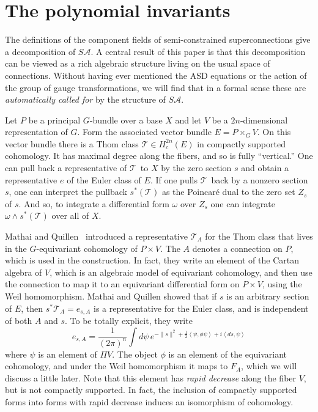 \documentclass[twoside]{amsart}
\newcommand{\enm}[1]{\ensuremath{#1}}
\renewcommand{\aa}{\enm{\mathcal{A}}}
\newcommand{\sa}{\enm{S\aa}}
\newcommand{\ip}[2]{\enm{\left<#1,#2\right>}}
\newcommand{\thom}{\enm{\mathcal{T}}}
\begin{document}
\section{The polynomial invariants}

The definitions of the component fields of semi-constrained
superconnections give a decomposition of \( \sa \).  A central result
of this paper is that this decomposition can be viewed as a rich
algebraic structure living on the usual space of connections.  Without
having ever mentioned the ASD equations or the action of the group of
gauge transformations, we will find that in a formal sense these are
\emph{automatically called for} by the structure of \( \sa \).

Let \( P \) be a principal \( G \)-bundle over a base \( X \) and let
\( V \) be a \( 2n \)-dimensional representation of \( G \).  Form the
associated vector bundle \( E = P\times_{G}V \).  On this vector
bundle there is a Thom class \( \thom\in H^{2n}_{c}(E) \) in compactly
supported cohomology.  It has maximal degree along the fibers, and so
is fully ``vertical.''  One can pull back a representative of \thom\
to \( X \) by the zero section \( s \) and obtain a representative \(
e \) of the Euler class of \( E \).  If one pulls \thom\ back by a
nonzero section \( s \), one can interpret the pullback \(
s^{*}(\thom) \) as the Poincar\'e dual to the zero set \( Z_{s} \) of
\( s \).  And so, to integrate a differential form \( \omega \) over
\( Z_{s} \) one can integrate \( \omega\wedge s^{*}(\thom) \) over all
of \( X \).

Mathai and Quillen~\cite{mathaiquillen} introduced a representative \(
\thom_{A} \) for the Thom class that lives in the \( G \)-equivariant
cohomology of \( P\times V. \) The \( A \) denotes a connection on \(
P \), which is used in the construction.  In fact, they write an
element of the Cartan algebra of \( V \), which is an algebraic model
of equivariant cohomology, and then use the connection to map it to an
equivariant differential form on \( P\times V \), using the Weil
homomorphism.  Mathai and Quillen showed that if \( s \) is an
arbitrary section of \( E \), then \( s^{*}\thom_{A} = e_{s, A} \) is
a representative for the Euler class, and is independent of both \( A
\) and \( s \).  To be totally explicit, they write
\begin{equation}
    \label{eq:mqform}
    e_{s,A} = \frac{1}{(2\pi)^{n}}\int d\psi\,e^{-\|s\|^{2} +
    \frac{1}{2}\ip{\psi}{\phi\psi} + i\ip{ds}{\psi}}
\end{equation}
where \( \psi \) is an element of \( \Pi V \).  The object \( \phi \)
is an element of the equivariant cohomology, and under the Weil
homomorphism it maps to \( F_{A} \), which we will discuss a little
later.  Note that this element has \emph{rapid decrease} along the
fiber \( V \), but is not compactly supported.  In fact, the
inclusion of compactly supported forms into forms with rapid
decrease induces an isomorphism of cohomology.
\end{document}
